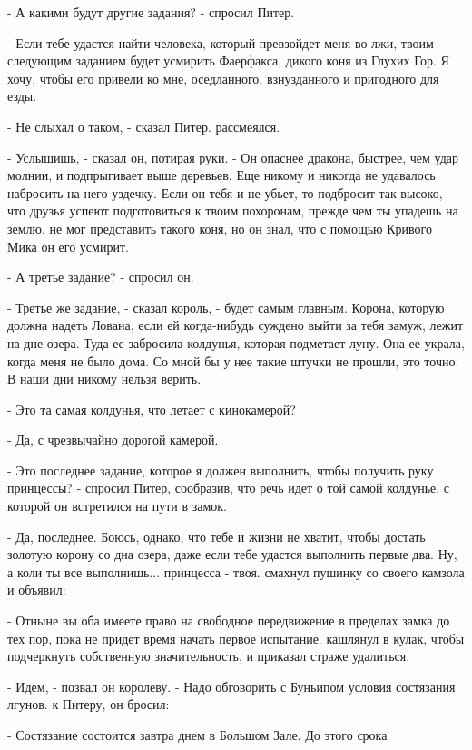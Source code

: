 \par- А какими будут другие задания? - спросил Питер.
\par- Если тебе удастся найти человека, который превзойдет меня во 
лжи, твоим следующим заданием будет усмирить Фаерфакса, дикого коня из 
Глухих Гор. Я хочу, чтобы его привели ко мне, оседланного, 
взнузданного и пригодного для езды.
\par- Не слыхал о таком, - сказал Питер.
 рассмеялся.
\par- Услышишь, - сказал он, потирая руки. - Он опаснее дракона, 
быстрее, чем удар молнии, и подпрыгивает выше деревьев. Еще никому и 
никогда не удавалось набросить на него уздечку. Если он тебя и не 
убьет, то подбросит так высоко, что друзья успеют подготовиться к 
твоим похоронам, прежде чем ты упадешь на землю.
 не мог представить такого коня, но он знал, что с помощью 
Кривого Мика он его усмирит.
\par- А третье задание? - спросил он.
\par- Третье же задание, - сказал король, - будет самым главным. 
Корона, которую должна надеть Лована, если ей когда-нибудь суждено 
выйти за тебя замуж, лежит на дне озера. Туда ее забросила колдунья, 
которая подметает луну. Она ее украла, когда меня не было дома. Со 
мной бы у нее такие штучки не прошли, это точно. В наши дни никому 
нельзя верить.
\par- Это та самая колдунья, что летает с кинокамерой?
\par- Да, с чрезвычайно дорогой камерой.
\par- Это последнее задание, которое я должен выполнить, чтобы 
получить руку принцессы? - спросил Питер, сообразив, что речь идет о 
той самой колдунье, с которой он встретился на пути в замок.
\par- Да, последнее. Боюсь, однако, что тебе и жизни не хватит, чтобы 
достать золотую корону со дна озера, даже если тебе удастся выполнить 
первые два. Ну, а коли ты все выполнишь... принцесса - твоя.
 смахнул пушинку со своего камзола и объявил:
\par- Отныне вы оба имеете право на свободное передвижение в пределах 
замка до тех пор, пока не придет время начать первое испытание.
 кашлянул в кулак, чтобы подчеркнуть собственную значительность, 
и приказал страже удалиться.
\par- Идем, - позвал он королеву. - Надо обговорить с Буньипом условия 
состязания лгунов.
 к Питеру, он бросил:
\par- Состязание состоится завтра днем в Большом Зале. До этого срока 
